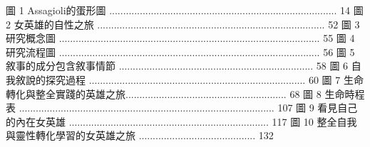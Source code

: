圖 1  Assagioli的蛋形圖 .................................................................................. 14 
圖 2  女英雄的自性之旅 .................................................................................. 52 
圖 3  研究概念圖 .............................................................................................. 55 
圖 4  研究流程圖 .............................................................................................. 56 
圖 5  敘事的成分包含敘事情節 ...................................................................... 58 
圖 6  自我敘說的探究過程 .............................................................................. 60 
圖 7  生命轉化與整全實踐的英雄之旅.......................................................... 68 
圖 8  生命時程表 ............................................................................................ 107 
圖 9  看見自己的內在女英雄 ........................................................................ 117 
圖 10 整全自我與靈性轉化學習的女英雄之旅 .......................................... 132 
 
